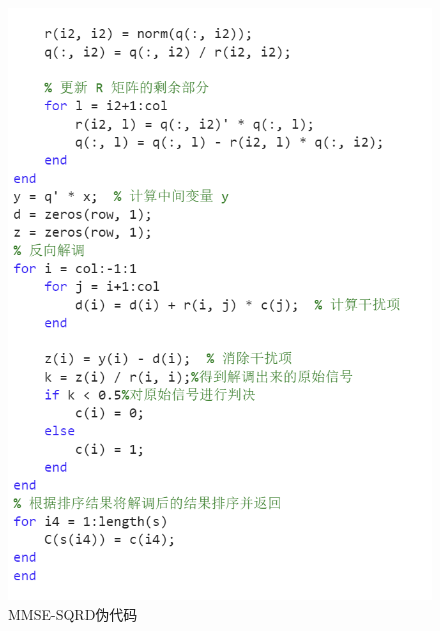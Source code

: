 \documentclass[a4paper,12pt]{article}
\begin{document}
\begin{figure}[h]
\begin{minipage}{0.45\textwidth}
			\includegraphics[width=\textwidth]{4.png}
		\end{minipage}
		\caption{MMSE-SQRD伪代码}
	\end{figure}
\end{document}
